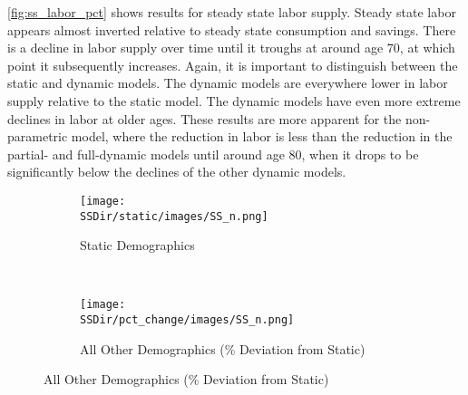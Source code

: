 \documentclass[10pt]{article}
\numberwithin{equation}{subsection}
\newcommand*{\SSDir}{../../code/Rick/OUTPUT/SS}
\begin{document}
\par \autoref{fig:ss_labor_pct} shows results for steady state labor supply. Steady state labor appears almost inverted relative to steady state consumption and savings. There is a decline in labor supply over time until it troughs at around age 70, at which point it subsequently increases. Again, it is important to distinguish between the static and dynamic models. The dynamic models are everywhere lower in labor supply relative to the static model. The dynamic models have even more extreme declines in labor at older ages. These results are more apparent for the non-parametric model, where the reduction in labor is less than the reduction in the partial- and full-dynamic models until around age 80, when it drops to be significantly below the declines of the other dynamic models.

\begin{figure}[H]
   \caption{\label{fig:ss_labor_pct}Steady State Labor Supply}
   \begin{subfigure}{0.5\textwidth}
      \centering
      \texttt{[image: \\SSDir/static/images/SS\_n.png]}
      \caption{Static Demographics}
   \end{subfigure}%
   ~
   \begin{subfigure}{0.5\textwidth}
      \centering
      \texttt{[image: \\SSDir/pct\_change/images/SS\_n.png]}
      \caption{All Other Demographics (\% Deviation from Static)}
   \end{subfigure}
\end{figure}


\end{document}
